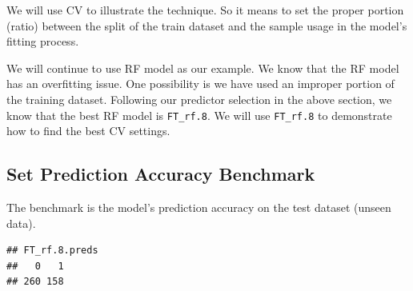 \documentclass[
]{book}
\newenvironment{Shaded}{\begin{snugshade}}{\end{snugshade}}
\newcommand{\CommentTok}[1]{\textcolor[rgb]{0.56,0.35,0.01}{\textit{#1}}}
\newcommand{\FloatTok}[1]{\textcolor[rgb]{0.00,0.00,0.81}{#1}}
\newcommand{\KeywordTok}[1]{\textcolor[rgb]{0.13,0.29,0.53}{\textbf{#1}}}
\newcommand{\NormalTok}[1]{#1}
\newcommand{\OperatorTok}[1]{\textcolor[rgb]{0.81,0.36,0.00}{\textbf{#1}}}
\newcommand{\StringTok}[1]{\textcolor[rgb]{0.31,0.60,0.02}{#1}}
\begin{document}
We will use CV to illustrate the technique. So it means to set the proper portion (ratio) between the split of the train dataset and the sample usage in the model's fitting process.

We will continue to use RF model as our example. We know that the RF model has an overfitting issue. One possibility is we have used an improper portion of the training dataset. Following our predictor selection in the above section, we know that the best RF model is \texttt{FT\_rf.8}. We will use \texttt{FT\_rf.8} to demonstrate how to find the best CV settings.

\hypertarget{set-prediction-accuracy-benchmark}{%
\subsection*{Set Prediction Accuracy Benchmark}\label{set-prediction-accuracy-benchmark}}


The benchmark is the model's prediction accuracy on the test dataset (unseen data).

\begin{Shaded}
\end{Shaded}

\begin{verbatim}
## FT_rf.8.preds
##   0   1 
## 260 158
\end{verbatim}
\end{document}

